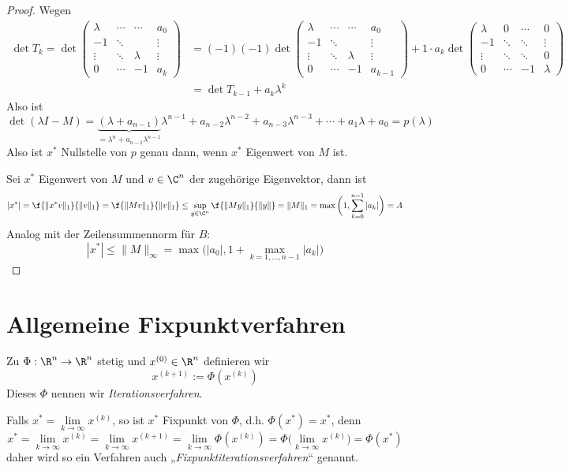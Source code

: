 \documentclass[11pt]{scrbook}
\begin{document}
\begin{st}
\begin{proof}
		Wegen
		\begin{align*}
			\det T_k = \det \begin{pmatrix}
				\lambda & \cdots & \cdots & a_0 \\
				-1 & \ddots &  &\vdots \\
				\vdots & \ddots & \lambda &\vdots \\
				0 & \cdots & -1 & a_k 
			\end{pmatrix}
			&= (-1)(-1) 
			\det \begin{pmatrix}
				\lambda & \cdots & \cdots & a_0 \\
				-1 & \ddots &  &\vdots \\
				\vdots & \ddots & \lambda &\vdots \\
				0 & \cdots & -1 & a_{k-1} 
			\end{pmatrix}
			+ 1 \cdot a_k 
			\det \begin{pmatrix}
				\lambda & 0 & \cdots &  0 \\
				-1 & \ddots & \ddots &  \vdots \\
				\vdots & \ddots & \ddots & 0  \\
				0 & \cdots & -1 & \lambda
			\end{pmatrix} \\
			&= \det T_{k-1} + a_k \lambda^k
		\end{align*}
		Also ist
		\[
			\det(\lambda I-M) = \underbrace{(\lambda +a_{n-1})}_{=\lambda^n + a_{n-1}\lambda^{n-1}} \lambda^{n-1} + a_{n-2} \lambda^{n-2} + a_{n-3}\lambda^{n-3} + \dotsb + a_1 \lambda + a_0 = p(\lambda)
		\]
		Also ist $x^*$ Nullstelle von $p$ genau dann, wenn $x^*$ Eigenwert von $M$ ist.

		Sei $x^*$ Eigenwert von $M$ und $v\in \C^n$ der zugehörige Eigenvektor, dann ist
		\[
			|x^*| 
			= \f {\|x^*v\|_1}{\|v\|_1} 
			= \f {\|Mv\|_1}{\|v\|_1}
			\le \sup_{y\in\C^n} \f {\|My\|_1}{\|y\|}
			= \|M\|_1
			= \max\bigg(1, \sum_{k=0}^{n-1} |a_k| \bigg)
			= A
		\]
		Analog mit der Zeilensummennorm für $B$:
		\[
			|x^*| \le \|M\|_\infty = \max\Big( |a_0|, 1 + \max_{k=1,\dotsc,n-1} |a_k| \Big)
		\]
	\end{proof}
\end{st}

\section{Allgemeine Fixpunktverfahren}

\begin{df}[Iterationsverfahren] \label{3.10}
	Zu $\Phi: \R^n \to \R^n$ stetig und $x^{(0)} \in \R^n$ definieren wir
	\[
		x^{(k+1)} := \Phi(x^{(k)})
	\]
	Dieses $\Phi$ nennen wir \emph{Iterationsverfahren}.
	\begin{note}
		Falls $x^* = \lim\limits_{k\to \infty} x^{(k)}$, so ist $x^*$ Fixpunkt von $\Phi$, d.h. $\Phi(x^*) = x^*$, denn
		\[
			x^* = \lim_{k\to \infty} x^{(k)} = \lim_{k\to \infty} x^{(k+1)} = \lim_{k\to \infty} \Phi(x^{(k)}) = \Phi\Big(\lim_{k\to \infty} x^{(k)}\Big) = \Phi(x^*)
		\]
		daher wird so ein Verfahren auch „\emph{Fixpunktiterationsverfahren}“ genannt.
	\end{note}
\end{df}
\end{document}
